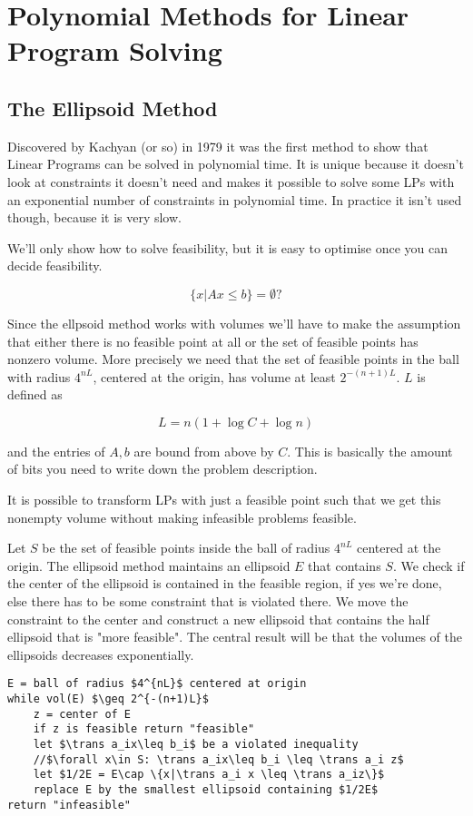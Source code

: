 \chapter{Polynomial Methods for Linear Program Solving}

\section{The Ellipsoid Method}

Discovered by Kachyan (or so) in 1979 it was the first method to show that Linear Programs can be solved in polynomial time. It is unique because it doesn't look at constraints it doesn't need and makes it possible to solve some LPs with an exponential number of constraints in polynomial time. In practice it isn't used though, because it is very slow.

We'll only show how to solve feasibility, but it is easy to optimise once you can decide feasibility.

\[\{x|Ax\leq b\} = \emptyset?\]

Since the ellpsoid method works with volumes we'll have to make the assumption that either there is no feasible point at all or the set of feasible points has nonzero volume. More precisely we need that the set of feasible points in the ball with radius $4^{nL}$, centered at the origin, has volume at least $2^{-(n+1)L}$. $L$ is defined as 

\[L=n(1+\log C+\log n)\]

and the entries of $A,b$ are bound from above by $C$. This is basically the amount of bits you need to write down the problem description.

It is possible to transform LPs with just a feasible point such that we get this nonempty volume without making infeasible problems feasible.

Let $S$ be the set of feasible points inside the ball of radius $4^{nL}$ centered at the origin. The ellipsoid method maintains an ellipsoid $E$ that contains $S$. We check if the center of the ellipsoid is contained in the feasible region, if yes we're done, else there has to be some constraint that is violated there. We move the constraint to the center and construct a new ellipsoid that contains the half ellipsoid that is "more feasible". The central result will be that the volumes of the ellipsoids decreases exponentially.

\begin{lstlisting}
E = ball of radius $4^{nL}$ centered at origin
while vol(E) $\geq 2^{-(n+1)L}$
	z = center of E
	if z is feasible return "feasible"
	let $\trans a_ix\leq b_i$ be a violated inequality
	//$\forall x\in S: \trans a_ix\leq b_i \leq \trans a_i z$
	let $1/2E = E\cap \{x|\trans a_i x \leq \trans a_iz\}$
	replace E by the smallest ellipsoid containing $1/2E$
return "infeasible"
\end{lstlisting}

